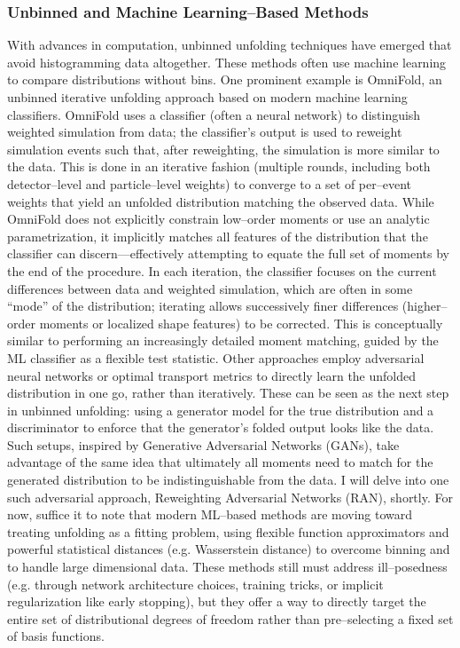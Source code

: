         \subsubsection{Unbinned and Machine Learning--Based Methods}
            With advances in computation, unbinned unfolding techniques have emerged that avoid histogramming data altogether.
            These methods often use machine learning to compare distributions without bins.
            One prominent example is OmniFold,\kd{} an unbinned iterative unfolding approach based on modern machine learning classifiers.
            OmniFold uses a classifier (often a neural network) to distinguish weighted simulation from data; the classifier’s output is used to reweight simulation events such that, after reweighting, the simulation is more similar to the data.
            This is done in an iterative fashion (multiple rounds, including both detector--level and particle--level weights) to converge to a set of per--event weights that yield an unfolded distribution matching the observed data.\kd{}
            While OmniFold does not explicitly constrain low--order moments or use an analytic parametrization, it implicitly matches all features of the distribution that the classifier can discern---effectively attempting to equate the full set of moments by the end of the procedure.
            In each iteration, the classifier focuses on the current differences between data and weighted simulation, which are often in some “mode” of the distribution; iterating allows successively finer differences (higher--order moments or localized shape features) to be corrected.
            This is conceptually similar to performing an increasingly detailed moment matching, guided by the ML classifier as a flexible test statistic.
            Other approaches employ adversarial neural networks or optimal transport metrics to directly learn the unfolded distribution in one go, rather than iteratively.\kd{}
            These can be seen as the next step in unbinned unfolding: using a generator model for the true distribution and a discriminator to enforce that the generator’s folded output looks like the data.
            Such setups, inspired by Generative Adversarial Networks (GANs),\kd{} take advantage of the same idea that ultimately all moments need to match for the generated distribution to be indistinguishable from the data.
            I will delve into one such adversarial approach, Reweighting Adversarial Networks (RAN), shortly.
            For now, suffice it to note that modern ML--based methods are moving toward treating unfolding as a fitting problem, using flexible function approximators and powerful statistical distances (e.g. Wasserstein distance\kd{}) to overcome binning and to handle large dimensional data.
            These methods still must address ill--posedness (e.g. through network architecture choices, training tricks, or implicit regularization like early stopping), but they offer a way to directly target the entire set of distributional degrees of freedom rather than pre--selecting a fixed set of basis functions.
